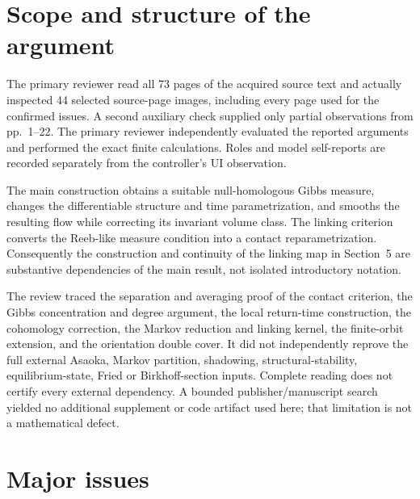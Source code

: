 \documentclass[10pt]{article}
\begin{document}
\section*{Scope and structure of the argument}
The primary reviewer read all 73 pages of the acquired source text and actually inspected 44 selected source-page images, including every page used for the confirmed issues. A second auxiliary check supplied only partial observations from pp. 1–22. The primary reviewer independently evaluated the reported arguments and performed the exact finite calculations. Roles and model self-reports are recorded separately from the controller’s UI observation.\par
The main construction obtains a suitable null-homologous Gibbs measure, changes the differentiable structure and time parametrization, and smooths the resulting flow while correcting its invariant volume class. The linking criterion converts the Reeb-like measure condition into a contact reparametrization. Consequently the construction and continuity of the linking map in Section 5 are substantive dependencies of the main result, not isolated introductory notation.\par
The review traced the separation and averaging proof of the contact criterion, the Gibbs concentration and degree argument, the local return-time construction, the cohomology correction, the Markov reduction and linking kernel, the finite-orbit extension, and the orientation double cover. It did not independently reprove the full external Asaoka, Markov partition, shadowing, structural-stability, equilibrium-state, Fried or Birkhoff-section inputs. Complete reading does not certify every external dependency. A bounded publisher/manuscript search yielded no additional supplement or code artifact used here; that limitation is not a mathematical defect.\par
\section*{Major issues}
\end{document}
